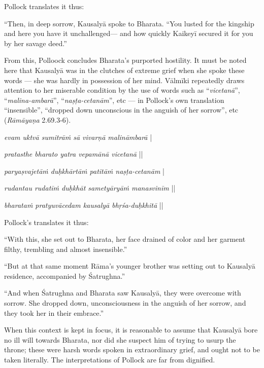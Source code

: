 Pollock translates it thus:

\begin{myquote}
“Then, in deep sorrow, Kausalyā spoke to Bharata. “You lusted for the kingship and here you have it unchallenged--- and how quickly Kaikeyī secured it for you by her savage deed.”
\end{myquote}

From this, Polloock concludes Bharata’s purported hostility. It must be noted here that Kausalyā was in the clutches of extreme grief when she spoke these words --- she was hardly in possession of her mind. Vālmīki repeatedly draws attention to her miserable condition by the use of words such as “{\sl vicetanā}”, “{\sl malina-ambarā}”, “{\sl naṣṭa-cetanām}”, etc --- in Pollock’s own translation “insensible”, “dropped down unconscious in the anguish of her sorrow”, etc ({\sl Rāmāyaṇa} 2.69.3-6). 

\begin{myquote}
{{\sl evam uktvā sumitrāṁ sā vivarṇā malināmbarā}} |

{\sl pratasthe bharato yatra vepamānā vicetanā} ||


{\sl paryaṣvajetāṁ duḥkhārtāṁ patitāṁ naṣṭa-cetanām} |

{\sl rudantau rudatīṁ duḥkhāt sametyāryāṁ manasvinīm} ||

{\sl bharataṁ pratyuvācedam kausalyā bhṛśa-duḥkhitā} || 
\end{myquote}

Pollock’s translates it thus:

\begin{myquote}
“With this, she set out to Bharata, her face drained of color and her garment filthy, trembling and almost insensible.”

“But at that same moment Rāma’s younger brother was setting out to Kausalyā residence, accompanied by Śatrughna.”

“And when Śatrughna and Bharata saw Kausalyā, they were overcome with sorrow. She dropped down, unconsciousness in the anguish of her sorrow, and they took her in their embrace.” 
\end{myquote}

When this context is kept in focus, it is reasonable to assume that Kausalyā bore no ill will towards Bharata, nor did she suspect him of trying to usurp the throne; these were harsh words spoken in extraordinary grief, and ought not to be taken literally. The interpretations of Pollock are far from dignified.

